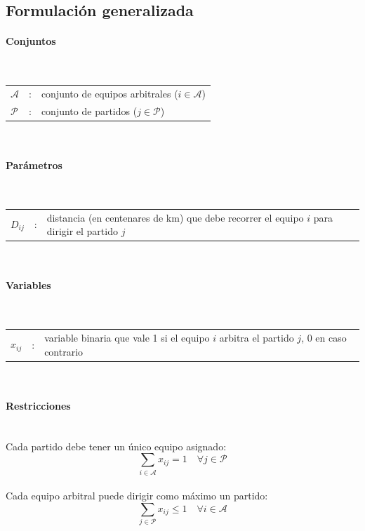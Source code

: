 \subsection{Formulación generalizada}

\paragraph{Conjuntos}\mbox{}\\
\begin{tabular}{l c l}
    $\mathcal{A}$ & : & conjunto de equipos arbitrales ($i \in \mathcal{A}$)\\
    $\mathcal{P}$ & : & conjunto de partidos ($j \in \mathcal{P}$)\\
\end{tabular}
\\

\paragraph{Parámetros}\mbox{}\\
\begin{tabular}{l c l}
    $D_{ij}$ & : & distancia (en centenares de km) que debe recorrer el equipo $i$ para dirigir el partido $j$ \\
\end{tabular}
\\

\paragraph{Variables}\mbox{}\\
\begin{tabular}{l c l}
    $x_{ij}$ & : & variable binaria que vale 1 si el equipo $i$ arbitra el partido $j$, 0 en caso contrario \\
\end{tabular}
\\

\paragraph{Restricciones}\mbox{}\\
Cada partido debe tener un único equipo asignado:
\begin{equation}
    \sum_{i \in \mathcal{A}} x_{ij} = 1 \quad \forall j \in \mathcal{P}
\end{equation}
\\
Cada equipo arbitral puede dirigir como máximo un partido:
\begin{equation}
    \sum_{j \in \mathcal{P}} x_{ij} \leq 1 \quad \forall i \in \mathcal{A}
\end{equation}
\\

